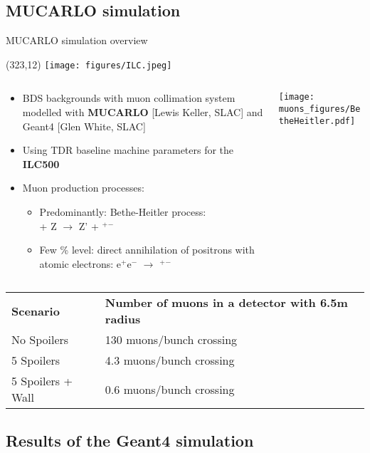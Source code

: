 \documentclass[xcolor={dvipsnames}]{beamer}
\newcommand{\ilclogo}{
  \setlength{\TPHorizModule}{1pt}
  \setlength{\TPVertModule}{1pt}
  \begin{textblock}{1}(323,12)
   \texttt{[image: figures/ILC.jpeg]}
  \end{textblock}
}
\begin{document}
\subsection{MUCARLO simulation}
\begin{frame}{MUCARLO simulation overview}
\ilclogo

\begin{columns}
 \begin{column}{0.7\textwidth}
  \begin{itemize}
\item BDS backgrounds with muon collimation system modelled with \textbf{MUCARLO} [Lewis Keller, SLAC] and Geant4 [Glen White, SLAC]
\item Using TDR baseline machine parameters for the \textbf{ILC500}
\item Muon production processes:
\begin{itemize}
\item Predominantly: Bethe-Heitler process:\\ \textgamma + Z $\rightarrow$ Z' + \textmu$^+$\textmu$^-$
\item Few \% level: direct annihilation of positrons with atomic electrons: e$^+$e$^-$ $\rightarrow$ \textmu$^+$\textmu$^-$
\end{itemize}

\end{itemize}

 \end{column}
 \begin{column}{0.3\textwidth}
  \texttt{[image: muons\_figures/BetheHeitler.pdf]}
 \end{column}
\end{columns}
\vspace*{0.3cm}
\begin{tabular}{ll}
\textbf{Scenario} & \textbf{Number of muons in a detector with 6.5m radius}\\
 No Spoilers & 130 muons/bunch crossing\\
 5 Spoilers& 4.3 muons/bunch crossing\\
 5 Spoilers + Wall & 0.6 muons/bunch crossing
\end{tabular}
\end{frame}



\subsection{Results of the Geant4 simulation}
\end{document}
